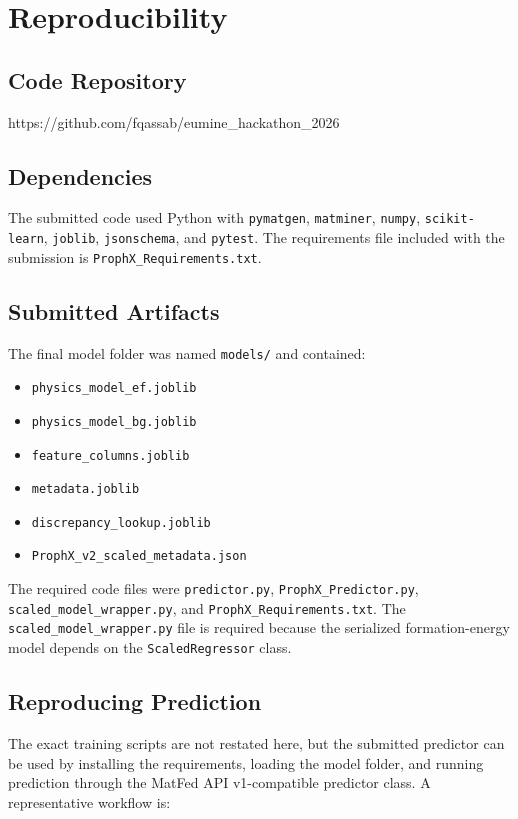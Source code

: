 \documentclass[10pt, a4paper]{article}
\begin{document}
\section{Reproducibility}

\subsection{Code Repository}
https://github.com/fqassab/eumine_hackathon_2026

\subsection{Dependencies}
The submitted code used Python with \texttt{pymatgen}, \texttt{matminer}, \texttt{numpy}, \texttt{scikit-learn}, \texttt{joblib}, \texttt{jsonschema}, and \texttt{pytest}. The requirements file included with the submission is \texttt{ProphX\_Requirements.txt}.

\subsection{Submitted Artifacts}
The final model folder was named \texttt{models/} and contained:

\begin{itemize}
  \item \texttt{physics\_model\_ef.joblib}
  \item \texttt{physics\_model\_bg.joblib}
  \item \texttt{feature\_columns.joblib}
  \item \texttt{metadata.joblib}
  \item \texttt{discrepancy\_lookup.joblib}
  \item \texttt{ProphX\_v2\_scaled\_metadata.json}
\end{itemize}

The required code files were \texttt{predictor.py}, \texttt{ProphX\_Predictor.py}, \texttt{scaled\_model\_wrapper.py}, and \texttt{ProphX\_Requirements.txt}. The \texttt{scaled\_model\_wrapper.py} file is required because the serialized formation-energy model depends on the \texttt{ScaledRegressor} class.

\subsection{Reproducing Prediction}
The exact training scripts are not restated here, but the submitted predictor can be used by installing the requirements, loading the model folder, and running prediction through the MatFed API v1-compatible predictor class. A representative workflow is:
\end{document}
